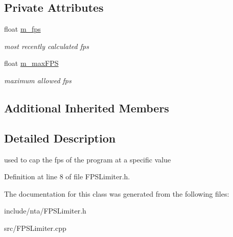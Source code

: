 \subsection*{Private Attributes}
\begin{DoxyCompactItemize}
\item 
\mbox{\label{classnta_1_1FPSLimiter_a06b2818f3bff96da37768829af13df2d}} 
float \hyperlink{classnta_1_1FPSLimiter_a06b2818f3bff96da37768829af13df2d}{m\+\_\+fps}
\begin{DoxyCompactList}\small\item\em most recently calculated fps \end{DoxyCompactList}\item 
\mbox{\label{classnta_1_1FPSLimiter_ae4a323afb44da70acd962cc4c395183d}} 
float \hyperlink{classnta_1_1FPSLimiter_ae4a323afb44da70acd962cc4c395183d}{m\+\_\+max\+F\+PS}
\begin{DoxyCompactList}\small\item\em maximum allowed fps \end{DoxyCompactList}\end{DoxyCompactItemize}
\subsection*{Additional Inherited Members}


\subsection{Detailed Description}
used to cap the fps of the program at a specific value 

Definition at line 8 of file F\+P\+S\+Limiter.\+h.



The documentation for this class was generated from the following files\+:\begin{DoxyCompactItemize}
\item 
include/nta/F\+P\+S\+Limiter.\+h\item 
src/F\+P\+S\+Limiter.\+cpp\end{DoxyCompactItemize}
